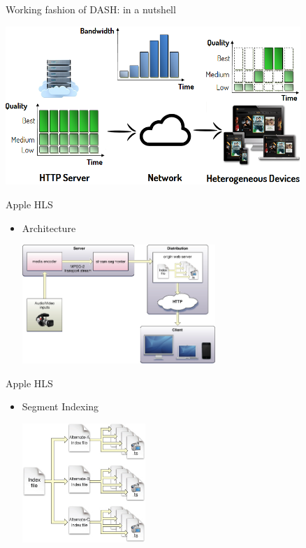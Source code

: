 \documentclass{beamer}
\begin{document}
\begin{frame}{Working fashion of DASH: in a nutshell}
	\begin{center}
		\includegraphics[height=6cm]{fig/adaptive-streaming.png}
	\end{center}
\end{frame}
\begin{frame}{Apple HLS}
	\begin{itemize}
		\item<1> Architecture
		\begin{center}
			\includegraphics[height=4.5cm]{fig/hls_arch.jpg}
		\end{center}
	\end{itemize}
\end{frame}
\begin{frame}{Apple HLS}
	\begin{itemize}
		\item<1> Segment Indexing
		\begin{center}
			\includegraphics[height=4.5cm]{fig/hls_indexing.jpg}
		\end{center}
	\end{itemize}
\end{frame}
\end{document}
